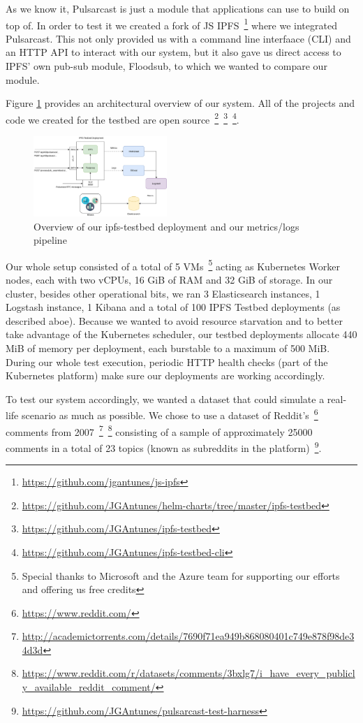 As we know it, Pulsarcast is just a module that applications can use to build
on top of. In order to test it we created a fork of JS
IPFS~\footnote{\url{https://github.com/jgantunes/js-ipfs}} where we integrated
Pulsarcast. This not only provided us with a command line interfaace (CLI) and
an HTTP API to interact with our system, but it also gave us direct access to
IPFS' own pub-sub module, Floodsub, to which we wanted to compare our module.

Figure \ref{fig:ipfs-testbed-and-metrics} provides an architectural overview of
our system. All of the projects and code we created for the testbed are
open
source~\footnote{\url{https://github.com/JGAntunes/helm-charts/tree/master/ipfs-testbed}}~\footnote{\url{https://github.com/JGAntunes/ipfs-testbed}}~\footnote{\url{https://github.com/JGAntunes/ipfs-testbed-cli}}.

\begin{figure}[!htb]
  \centering
  \includegraphics[width=0.45\textwidth]{img/ipfs-testbed-and-metrics.png}
  \caption{Overview of our ipfs-testbed deployment and our metrics/logs
  pipeline}
  \label{fig:ipfs-testbed-and-metrics}
\end{figure}

Our whole setup consisted of a total of 5 VMs~\footnote{Special thanks to
Microsoft and the Azure team for supporting our efforts and offering us free
credits} acting as Kubernetes Worker nodes, each with two vCPUs, 16 GiB of RAM
and 32 GiB of storage. In our cluster, besides other operational bits, we ran 3
Elasticsearch instances, 1 Logstash instance, 1 Kibana and a total of 100 IPFS
Testbed deployments (as described aboe). Because we wanted to avoid resource
starvation and to better take advantage of the Kubernetes scheduler, our
testbed deployments allocate 440 MiB of memory per deployment, each burstable
to a maximum of 500 MiB. During our whole test execution, periodic HTTP health
checks (part of the Kubernetes platform) make sure our deployments are working
accordingly.

To test our system accordingly, we wanted a dataset that could simulate a
real-life scenario as much as possible. We chose to use a dataset of
Reddit's~\footnote{\url{https://www.reddit.com/}} comments from
2007~\footnote{\url{http://academictorrents.com/details/7690f71ea949b868080401c749e878f98de34d3d}}~\footnote{\url{https://www.reddit.com/r/datasets/comments/3bxlg7/i_have_every_publicly_available_reddit_comment/}}
consisting of a sample of approximately 25000 comments in a total of 23 topics
(known as subreddits in the platform)~\footnote{\url{https://github.com/JGAntunes/pulsarcast-test-harness}}.

